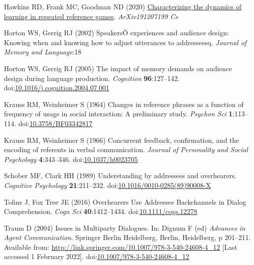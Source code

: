 \documentclass[
  english,
  a4paper,
]{article}
\newlength{\cslhangindent}
\newlength{\cslentryspacingunit} %
\newenvironment{CSLReferences}[2] %
 {%
  \setlength{\parindent}{0pt}
  \ifodd #1
  \let\oldpar\par
  \def\par{\hangindent=\cslhangindent\oldpar}
  \fi
  \setlength{\parskip}{#2\cslentryspacingunit}
 }%
 {}
\begin{document}
\begin{CSLReferences}{1}{0}
\leavevmode{}%
Hawkins RD, Frank MC, Goodman ND (2020) \href{http://arxiv.org/abs/1912.07199}{Characterizing the dynamics of learning in repeated reference games}. \emph{ArXiv191207199 Cs}

\leavevmode{}%
Horton WS, Gerrig RJ (2002) {SpeakersÕ} experiences and audience design: Knowing when and knowing how to adjust utterances to addresseesq. \emph{Journal of Memory and Language}:18

\leavevmode{}%
Horton WS, Gerrig RJ (2005) The impact of memory demands on audience design during language production. \emph{Cognition} \textbf{96}:127--142. doi:\href{https://doi.org/10.1016/j.cognition.2004.07.001}{10.1016/j.cognition.2004.07.001}

\leavevmode{}%
Krauss RM, Weinheimer S (1964) Changes in reference phrases as a function of frequency of usage in social interaction: A preliminary study. \emph{Psychon Sci} \textbf{1}:113--114. doi:\href{https://doi.org/10.3758/BF03342817}{10.3758/BF03342817}

\leavevmode{}%
Krauss RM, Weinheimer S (1966) Concurrent feedback, confirmation, and the encoding of referents in verbal communication. \emph{Journal of Personality and Social Psychology} \textbf{4}:343--346. doi:\href{https://doi.org/10.1037/h0023705}{10.1037/h0023705}

\leavevmode{}%
Schober MF, Clark HH (1989) Understanding by addressees and overhearers. \emph{Cognitive Psychology} \textbf{21}:211--232. doi:\href{https://doi.org/10.1016/0010-0285(89)90008-X}{10.1016/0010-0285(89)90008-X}

\leavevmode{}%
Tolins J, Fox Tree JE (2016) Overhearers {Use Addressee Backchannels} in {Dialog Comprehension}. \emph{Cogn Sci} \textbf{40}:1412--1434. doi:\href{https://doi.org/10.1111/cogs.12278}{10.1111/cogs.12278}

\leavevmode{}%
Traum D (2004) Issues in {Multiparty Dialogues}. In: Dignum F (ed) \emph{Advances in {Agent Communication}}. {Springer Berlin Heidelberg}, {Berlin, Heidelberg}, p 201--211. Available from: \url{http://link.springer.com/10.1007/978-3-540-24608-4_12} {[}Last accessed 1 February 2022{]}. doi:\href{https://doi.org/10.1007/978-3-540-24608-4_12}{10.1007/978-3-540-24608-4\_12}

\end{CSLReferences}
\end{document}
